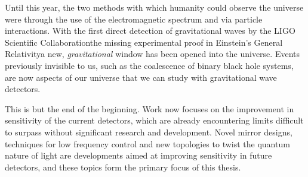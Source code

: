Until this year, the two methods with which humanity could observe the universe were through the use of the electromagnetic spectrum and via particle interactions. With the first direct detection of gravitational waves by the LIGO Scientific Collaboration\textemdash the missing experimental proof in Einstein's General Relativity\textemdash a new, \emph{gravitational} window has been opened into the universe. Events previously invisible to us, such as the coalescence of binary black hole systems, are now aspects of our universe that we can study with gravitational wave detectors.

This is but the end of the beginning. Work now focuses on the improvement in sensitivity of the current detectors, which are already encountering limits difficult to surpass without significant research and development. Novel mirror designs, techniques for low frequency control and new topologies to twist the quantum nature of light are developments aimed at improving sensitivity in future detectors, and these topics form the primary focus of this thesis.
